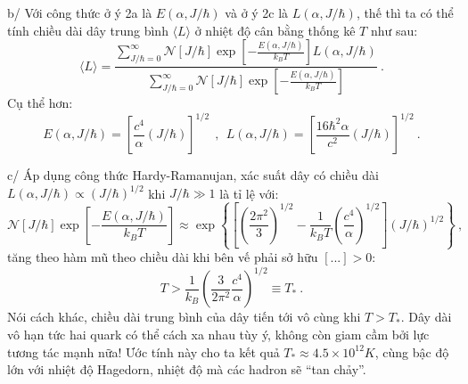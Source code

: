\begin{enumerate}
    b/ Với công thức ở ý 2a là $E(\alpha,J/\hbar)$ và ở ý 2c là $L(\alpha,J/\hbar)$, thế thì ta có thể tính chiều dài dây trung bình $\langle L \rangle$ ở nhiệt độ cân bằng thống kê $T$ như sau:
    \begin{equation} \label{eq9_String_theory}
        \langle L \rangle = \frac{\displaystyle \sum_{J/\hbar=0}^{\infty} \mathcal{N}[J/\hbar] \exp\left[ - \frac{E(\alpha,J/\hbar)}{k_B T} \right] L(\alpha,J/\hbar)}{\displaystyle \sum_{J/\hbar=0}^{\infty} \mathcal{N}[J/\hbar] \exp\left[ - \frac{E(\alpha,J/\hbar)
        }{k_B T} \right]} \ .
    \end{equation}
    Cụ thể hơn:
    \begin{equation} \label{eq10_String_theory}
        E(\alpha,J/\hbar) = \left[ \frac{c^4}{\alpha} (J/\hbar) \right]^{1/2} \ \ , \ \ L(\alpha,J/\hbar) = \left[ \frac{16 \hbar^2 \alpha}{c^2} (J/\hbar) \right]^{1/2}  \ .
    \end{equation}

    c/ Áp dụng công thức Hardy-Ramanujan, xác suất dây có chiều dài $L(\alpha,J/\hbar) \propto (J/\hbar)^{1/2}$ khi $J/\hbar \gg 1$ là tỉ lệ với:
    \begin{equation} \label{eq11_String_theory}
    \mathcal{N}[J/\hbar] \exp\left[ - \frac{E(\alpha,J/\hbar)}{k_B T} \right] \approx \exp \left\{ \left[ \left(\frac{2\pi^2}{3}\right)^{1/2} - \frac1{k_B T} \left( \frac{c^4}{\alpha} \right)^{1/2} \right] (J/\hbar)^{1/2}\right\} \ ,
    \end{equation}
    tăng theo hàm mũ theo chiều dài khi bên vế phải sở hữu $[...]>0$:
    \begin{equation} \label{eq12_String_theory}
        T > \frac1{k_B} \left( \frac{3}{2\pi^2} \frac{c^4}{\alpha} \right)^{1/2} \equiv T_* \ .
    \end{equation}
    Nói cách khác, chiều dài trung bình của dây tiến tới vô cùng khi $T>T_*$. Dây dài vô hạn tức hai quark có thể cách xa nhau tùy ý, không còn giam cầm bởi lực tương tác mạnh nữa! Ước tính này cho ta kết quả $T_* \approx 4.5 \times 10^{12} \si{K} $, cùng bậc độ lớn với nhiệt độ Hagedorn, nhiệt độ mà các hadron sẽ ``tan chảy''.
\end{enumerate}

